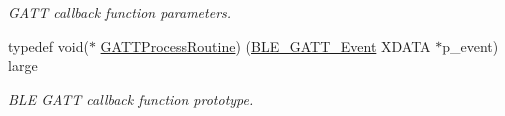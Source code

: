\begin{DoxyCompactItemize}
\begin{DoxyCompactList}\small\item\em G\+A\+TT callback function parameters. \end{DoxyCompactList}\item 
typedef void($\ast$ \hyperlink{group___b_l_e___g_a_t_t_ga3b479749f90cd267d7c3a3eea4605ff6}{G\+A\+T\+T\+Process\+Routine}) (\hyperlink{struct_b_l_e___g_a_t_t___event}{B\+L\+E\+\_\+\+G\+A\+T\+T\+\_\+\+Event} X\+D\+A\+TA $\ast$p\+\_\+event) large\hypertarget{group___b_l_e___g_a_t_t_ga3b479749f90cd267d7c3a3eea4605ff6}{}\label{group___b_l_e___g_a_t_t_ga3b479749f90cd267d7c3a3eea4605ff6}

\begin{DoxyCompactList}\small\item\em B\+LE G\+A\+TT callback function prototype. \end{DoxyCompactList}\end{DoxyCompactItemize}

